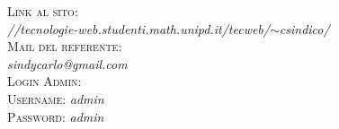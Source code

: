 \documentclass[12pt]{article}
\begin{document}
\begin{titlepage}
		
		\textsc{\Large Link al sito:}\\[0.2cm]	
		\textit{//tecnologie-web.studenti.math.unipd.it/tecweb/$\sim$csindico/}\\[1cm]
		
		\textsc{\Large Mail del referente:}\\[0.2cm]	
		\textit{sindycarlo@gmail.com}\\[1cm]
		
		
			\textsc{\Large Login Admin:}\\[0.2cm]
			\textsc{ Username:}\textit{ admin }\\[0.1mm]
			\textsc{ Password:}\textit{ admin }\\[0.1mm]
			
		\vfill
	\end{titlepage}
	
	\newpage
	\renewcommand{\contentsname}{Indice}
	\tableofcontents
	
	
	\newpage
	
\end{document}
